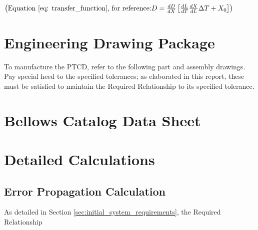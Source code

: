 \documentclass[12pt, letterpaper]{report}%
\newcommand{\device}{PTCD}
\begin{document}
\begin{appendices}
\begin{table}[H]
\begin{tabular}{|m{}|m{}|m{}|}
        \\ \hline

    \end{tabular}
\end{table}

$\left( \text{Equation\ \ref{eq: transfer_function}, for reference:} D = \frac{dD}{dX} \left[ \frac{dL}{dT} \frac{dX}{dL} \Delta T + X_0 \right] \right)$

\chapter{Engineering Drawing Package}
\label{app:drawings}

To manufacture the \device , refer to the following part and assembly drawings.
Pay special heed to the specified tolerances; as elaborated in this report, these must be satisfied to maintain the Required Relationship to its specified tolerance.



\chapter{Bellows Catalog Data Sheet}
\label{app:datasheets}







\chapter{Detailed Calculations}
\label{app:calculations}

\section{Error Propagation Calculation}
\label{app:errorProp}

    As detailed in Section \ref{sec:initial_system_requirements}, the Required Relationship


\end{appendices}
\end{document}

